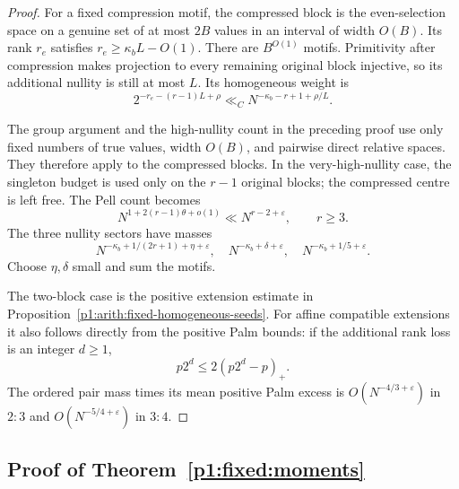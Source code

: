 \begin{proof}
For a fixed compression motif, the compressed block is
the even-selection space on a genuine set of at most
\(2B\) values in an interval of width \(O(B)\).
Its rank \(r_e\) satisfies
\(r_e\ge\kappa_bL-O(1)\). There are \(B^{O(1)}\) motifs.
Primitivity after compression makes projection to
every remaining original block injective, so its
additional nullity is still at most \(L\).
Its homogeneous weight is
\[
 2^{-r_e-(r-1)L+\rho}
       \ll_C N^{-\kappa_b-r+1+\rho/L}.
\]

The group argument and the high-nullity count in the
preceding proof use only fixed numbers of true values,
width \(O(B)\), and pairwise direct relative spaces.
They therefore apply to the compressed blocks.
In the very-high-nullity case, the singleton budget
is used only on the \(r-1\) original blocks; the
compressed centre is left free. The Pell count becomes
\[
 N^{1+2(r-1)\theta+o(1)}
       \ll N^{r-2+\varepsilon},\qquad r\ge3.
\]
The three nullity sectors have masses
\[
 N^{-\kappa_b+1/(2r+1)+\eta+\varepsilon},\quad
 N^{-\kappa_b+\delta+\varepsilon},\quad
 N^{-\kappa_b+1/5+\varepsilon}.
\]
Choose \(\eta,\delta\) small and sum the motifs.

The two-block case is the positive extension estimate
in Proposition~\ref{p1:arith:fixed-homogeneous-seeds}.
For affine compatible extensions it also follows
directly from the positive Palm bounds:
if the additional rank loss is an integer \(d\ge1\),
\[
 p2^d\le2(p2^d-p)_+.
\]
The ordered pair mass times its mean positive Palm
excess is \(O(N^{-4/3+\varepsilon})\) in \(2:3\)
and \(O(N^{-5/4+\varepsilon})\) in \(3:4\).
\end{proof}

\subsection{Proof of Theorem~\ref{p1:fixed:moments}}
\label{p14:comp:fixed-moments}

